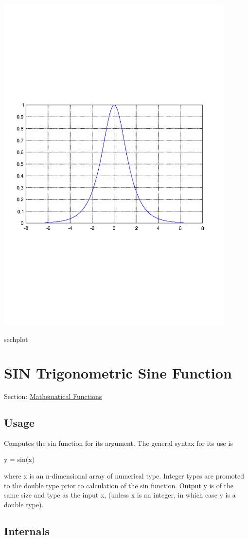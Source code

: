  
\begin{DoxyImage}
\includegraphics[width=12cm]{sechplot}
\caption{sechplot}
\end{DoxyImage}
 \hypertarget{mathfunctions_sin}{}\section{S\-I\-N Trigonometric Sine Function}\label{mathfunctions_sin}
Section\-: \hyperlink{sec_mathfunctions}{Mathematical Functions} \hypertarget{vtkwidgets_vtkxyplotwidget_Usage}{}\subsection{Usage}\label{vtkwidgets_vtkxyplotwidget_Usage}
Computes the {\ttfamily sin} function for its argument. The general syntax for its use is \begin{DoxyVerb}  y = sin(x)
\end{DoxyVerb}
 where {\ttfamily x} is an {\ttfamily n}-\/dimensional array of numerical type. Integer types are promoted to the {\ttfamily double} type prior to calculation of the {\ttfamily sin} function. Output {\ttfamily y} is of the same size and type as the input {\ttfamily x}, (unless {\ttfamily x} is an integer, in which case {\ttfamily y} is a {\ttfamily double} type). \hypertarget{transforms_svd_Function}{}\subsection{Internals}\label{transforms_svd_Function}
